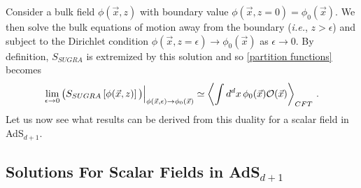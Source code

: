 \documentclass[../PhD.tex]{subfiles}
\begin{document}
Consider a bulk field $\phi(\vec x,z)$ with boundary value $\phi(\vec x, z=0) = \phi_0 (\vec x)$. We then solve the bulk equations of motion away from the boundary ({\it i.e.}, $z > \epsilon$) and subject to the Dirichlet condition $\phi(\vec x, z=\epsilon) \to \phi_0(\vec x)$ as $\epsilon \to 0$. By definition, $S_{SUGRA}$ is extremized by this solution and so \eqref{partition functions} becomes \cite{hep-th/9802109, hep-th/9802150}
\begin{align}
\label{ads/cft duality}
\lim_{\epsilon \to 0} \big( S_{SUGRA} \left[ \phi(\vec x, z) \right] \big) \Big|_{\phi (\vec x, \epsilon) \to \phi_0(\vec x)} \simeq \left\langle \int d^dx \, \phi_0(\vec x) \mathcal O(\vec x) \right\rangle_{CFT} \, .
\end{align}
Let us now see what results can be derived from this duality for a scalar field in AdS$_{d+1}$.


\subsection{Solutions For Scalar Fields in AdS$_{d+1}$}
\label{ssec: scalar fields}
\end{document}
